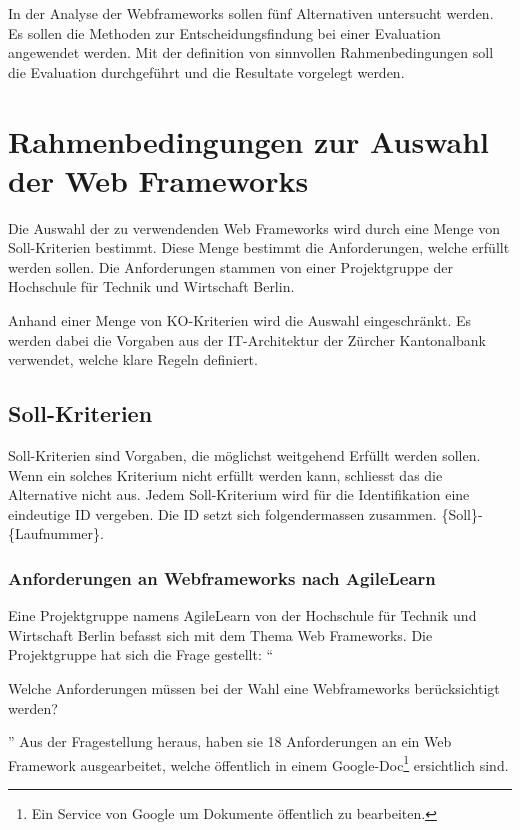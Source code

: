   In der Analyse der Webframeworks sollen fünf Alternativen untersucht werden.
  Es sollen die Methoden zur Entscheidungsfindung bei einer Evaluation
  angewendet werden. Mit der definition von sinnvollen Rahmenbedingungen soll
  die Evaluation durchgeführt und die Resultate vorgelegt werden.
    
  \section{Rahmenbedingungen zur Auswahl der Web Frameworks}
  
  Die Auswahl der zu verwendenden Web Frameworks wird durch eine Menge von
  Soll-Kriterien bestimmt. Diese Menge bestimmt die Anforderungen, welche
  erfüllt werden sollen. Die Anforderungen stammen von einer Projektgruppe der
  Hochschule für Technik und Wirtschaft Berlin.
  
  Anhand einer Menge von KO-Kriterien wird die Auswahl eingeschränkt. Es werden
  dabei die Vorgaben aus der IT-Architektur der Zürcher Kantonalbank verwendet,
  welche klare Regeln definiert.

  \subsection{Soll-Kriterien}
  
  Soll-Kriterien sind Vorgaben, die möglichst weitgehend Erfüllt werden sollen.
  Wenn ein solches Kriterium nicht erfüllt werden kann, schliesst das die
  Alternative nicht aus. Jedem Soll-Kriterium wird für die Identifikation eine
  eindeutige ID vergeben. Die ID setzt sich folgendermassen zusammen.
  \{Soll\}-\{Laufnummer\}.
  
  \subsubsection{Anforderungen an Webframeworks nach AgileLearn}
  
  Eine Projektgruppe namens AgileLearn von der Hochschule für Technik und
  Wirtschaft Berlin befasst sich mit dem Thema Web Frameworks. Die
  Projektgruppe hat sich die Frage gestellt: ``\begin{itshape}Welche
  Anforderungen müssen bei der Wahl eine Webframeworks berücksichtigt
  werden?\end{itshape}'' Aus der Fragestellung heraus, haben sie 18
  Anforderungen an ein Web Framework ausgearbeitet, welche öffentlich in einem
  Google-Doc\footnote{Ein Service von Google um Dokumente öffentlich zu
  bearbeiten.} ersichtlich sind.
  
